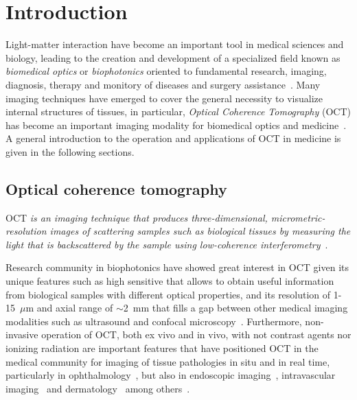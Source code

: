 \newpage
{}
\chapter{Introduction}\label{chap:intro}

Light-matter interaction have become an important tool in medical sciences and biology, leading to the creation and development of a specialized field known as \textit{biomedical optics} or \textit{biophotonics} oriented to fundamental research, imaging, diagnosis, therapy and monitory of diseases and surgery assistance~\cite{Keiser2016_Biophotonics}. Many imaging techniques have emerged to cover the general necessity to visualize internal structures of tissues, in particular, \textit{Optical Coherence Tomography} (OCT) has become an important imaging modality for biomedical optics and medicine~\cite{Keiser2016_Biophotonics, Fujimoto2015_Optical}. A general introduction to the operation and applications of OCT in medicine is given in the following sections.

\section{Optical coherence tomography}

OCT \textit{is an imaging technique that produces three-dimensional, micrometric-resolution images of scattering samples such as biological tissues by measuring the light that is backscattered by the sample using low-coherence interferometry}~\cite{Huang1991_Optical, Fujimoto2015_Optical}.

Research community in biophotonics have showed great interest in OCT given its unique features such as high sensitive that allows to obtain useful information from biological samples with different optical properties, and its resolution of 1-15~$\mu$m and axial range of $\sim$2~mm that fills a gap between other medical imaging modalities such as ultrasound and confocal microscopy~\cite{Fujimoto2015_Introduction}. Furthermore, non-invasive operation of OCT, both ex vivo and in vivo, with not contrast agents nor ionizing radiation are important features that have positioned OCT in the medical community for imaging of tissue pathologies in situ and in real time, particularly in ophthalmology~\cite{Swanson1993_vivo, Schuman2004_Optical}, but also in endoscopic imaging~\cite{Tearney1997_vivo}, intravascular imaging~\cite{Tearney1996_CatheterBased, Bouma2017_Intravascular} and dermatology~\cite{Welzel1997_Optical, Olsen2018_Advances} among others~\cite{Colston1998_Imaging, Suter2012_Optical, Vakoc2012_Cancer}.

